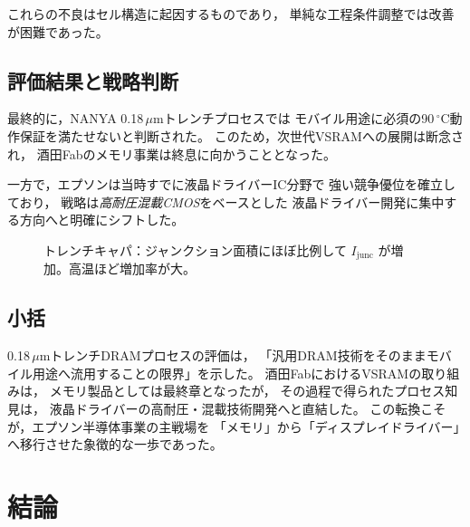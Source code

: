 \documentclass[conference]{IEEEtran}
\begin{document}
これらの不良はセル構造に起因するものであり，
単純な工程条件調整では改善が困難であった。

\subsection{評価結果と戦略判断}
最終的に，NANYA 0.18\,$\mu$mトレンチプロセスでは
モバイル用途に必須の90\,$^\circ$C動作保証を満たせないと判断された。
このため，次世代VSRAMへの展開は断念され，
酒田Fabのメモリ事業は終息に向かうこととなった。

一方で，エプソンは当時すでに液晶ドライバーIC分野で
強い競争優位を確立しており，
戦略は\emph{高耐圧混載CMOS}をベースとした
液晶ドライバー開発に集中する方向へと明確にシフトした。

\begin{figure}[t]
\centering
{}
\caption{トレンチキャパ：ジャンクション面積にほぼ比例して $I_{\mathrm{junc}}$ が増加。高温ほど増加率が大。}
\label{fig:trench_area_leak}
\end{figure}

\subsection{小括}
0.18\,$\mu$mトレンチDRAMプロセスの評価は，
「汎用DRAM技術をそのままモバイル用途へ流用することの限界」を示した。
酒田FabにおけるVSRAMの取り組みは，
メモリ製品としては最終章となったが，
その過程で得られたプロセス知見は，
液晶ドライバーの高耐圧・混載技術開発へと直結した。
この転換こそが，エプソン半導体事業の主戦場を
「メモリ」から「ディスプレイドライバー」へ移行させた象徴的な一歩であった。

\section{結論}
\end{document}
